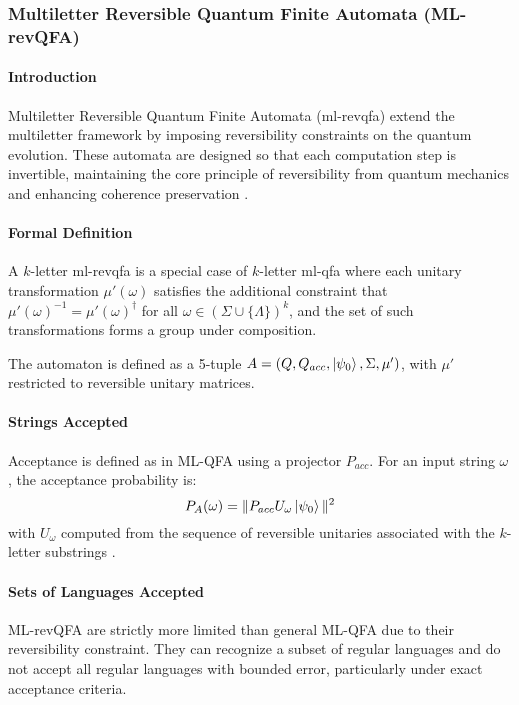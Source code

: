\subsubsection{Multiletter Reversible Quantum Finite Automata (ML-revQFA)}
\paragraph{Introduction}
Multiletter Reversible Quantum Finite Automata (\gls{ml-revqfa}) extend the multiletter framework by imposing reversibility constraints on the quantum evolution. These automata are designed so that each computation step is invertible, maintaining the core principle of reversibility from quantum mechanics and enhancing coherence preservation \cite{belovs2007multi}.

\paragraph{Formal Definition}
A $k$-letter \gls{ml-revqfa} is a special case of $k$-letter \gls{ml-qfa} where each unitary transformation $\mu'(\omega)$ satisfies the additional constraint that $\mu'(\omega)^{-1} = \mu'(\omega)^\dagger$ for all $\omega \in (\Sigma \cup \{\Lambda\})^k$, and the set of such transformations forms a group under composition.

The automaton is defined as a 5-tuple $A = (Q, Q_{acc}, \ket{\psi_0}, \Sigma, \mu')$, with $\mu'$ restricted to reversible unitary matrices.

\paragraph{Strings Accepted}
Acceptance is defined as in ML-QFA using a projector $P_{acc}$. For an input string $\omega$, the acceptance probability is:
\[
P_A(\omega) = \| P_{acc} U_{\omega} \ket{\psi_0} \|^2
\]
with $U_{\omega}$ computed from the sequence of reversible unitaries associated with the $k$-letter substrings \cite{belovs2007multi}.

\paragraph{Sets of Languages Accepted}
ML-revQFA are strictly more limited than general ML-QFA due to their reversibility constraint. They can recognize a subset of regular languages and do not accept all regular languages with bounded error, particularly under exact acceptance criteria.

